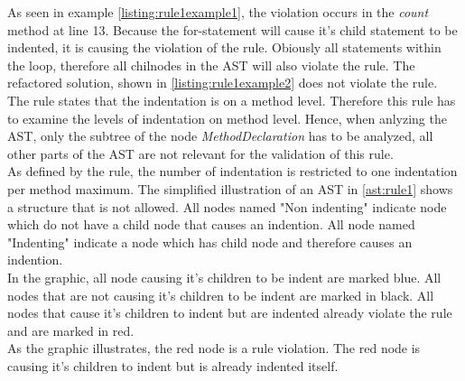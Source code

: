 As seen in example \ref{listing:rule1example1}, the violation occurs in the \textit{count} method at line 13. Because the for-statement will cause it's child statement to be indented, it is causing the violation of the rule. Obiously all statements within the loop, therefore all chilnodes in the \acf{AST} will also violate the rule. The refactored solution, shown in \ref{listing:rule1example2} does not violate the rule. 
\\

The rule states that the indentation is on a method level. Therefore this rule has to examine the levels of indentation on method level. Hence, when anlyzing the \acf{AST}, only the subtree of the node \textit{MethodDeclaration} has to be analyzed, all other parts of the \acf{AST} are not relevant for the validation of this rule.
\\

As defined by the rule, the number of indentation is restricted to one indentation per method maximum. The simplified illustration of an \acf{AST} in \ref{ast:rule1} shows a structure that is not allowed. All nodes named "Non indenting" indicate node which do not have a child node that causes an indention. All node named "Indenting" indicate a node which has child node and therefore causes an indention.
\\

In the graphic, all node causing it's children to be indent are marked blue. All nodes that are not causing it's children to be indent are marked in black. 
All nodes that cause it's children to indent but are indented already violate the rule and are marked in red. 
\\

As the graphic illustrates, the red node is a rule violation. The red node is causing it's children to indent but is already indented itself. 
\\

\label{ast:rule1}

